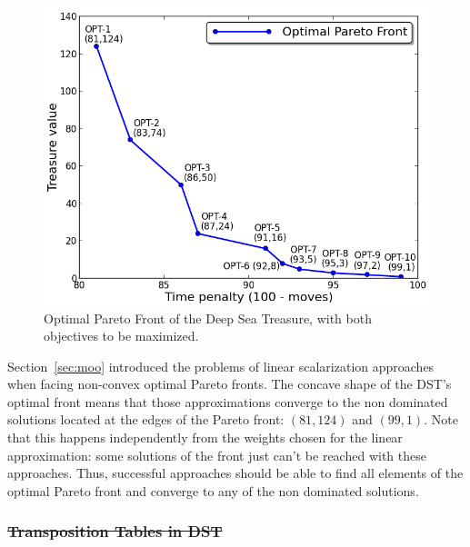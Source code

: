 \documentclass[journal]{IEEEtran}
\providecommand{\DIFaddtex}[1]{{\protect\color{blue}\uwave{#1}}} %
\providecommand{\DIFdeltex}[1]{{\protect\color{red}\sout{#1}}}                      %
\providecommand{\DIFaddbegin}{} %
\providecommand{\DIFaddend}{} %
\providecommand{\DIFdelbegin}{} %
\providecommand{\DIFdelend}{} %
\providecommand{\DIFadd}[1]{\texorpdfstring{\DIFaddtex{#1}}{#1}} %
\providecommand{\DIFdel}[1]{\texorpdfstring{\DIFdeltex{#1}}{}} %
\begin{document}
\begin{figure}[!t]
\begin{center}
\includegraphics[width=1.0\columnwidth]{img/optDST.png}
\end{center}
\caption{Optimal Pareto Front of the Deep Sea Treasure, with both objectives to be maximized.}
\label{fig:optDst}
\end{figure}

Section~\ref{sec:moo} introduced the problems of linear scalarization approaches when facing non-convex optimal Pareto fronts. The concave shape of the DST's optimal front means that those approximations converge to the non dominated solutions located at the edges of the Pareto front: $(81,124)$ and $(99,1)$. Note that this happens independently from the weights chosen for the linear approximation: some solutions of the front just can't be reached with these approaches. Thus, successful approaches should be able to find all elements of the optimal Pareto front and converge to any of the non dominated solutions.

\DIFdelbegin \subsubsection{\DIFdel{Transposition Tables in DST}} %
\addtocounter{subsubsection}{-1}%
\DIFdelend \DIFaddbegin \subsection{\DIFadd{Heuristics for DST}} \label{ssec:heurDST}
\DIFaddend 
\end{document}
